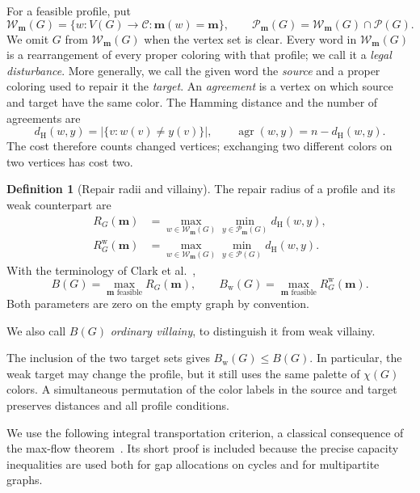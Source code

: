 \documentclass[11pt,reqno]{amsart}
\numberwithin{equation}{section}
\theoremstyle{definition}
\newtheorem{definition}[theorem]{Definition}
\theoremstyle{remark}
\begin{document}
For a feasible profile, put
\[
 \mathcal W_{\mathbf m}(G)=
 \{w:V(G)\to\mathcal C:\mathbf m(w)=\mathbf m\},\qquad
 \mathcal P_{\mathbf m}(G)=\mathcal W_{\mathbf m}(G)\cap\mathcal P(G).
\]
We omit $G$ from $\mathcal W_{\mathbf m}(G)$ when the vertex set is clear.
Every word in $\mathcal W_{\mathbf m}(G)$ is a rearrangement of every
proper coloring with that profile; we call it a \emph{legal disturbance}.
More generally, we call the given word the \emph{source} and a proper
coloring used to repair it the \emph{target}. An \emph{agreement} is a
vertex on which source and target have the same color.
The Hamming distance and the number of agreements are
\[
 d_{\mathrm H}(w,y)=|\{v:w(v)\ne y(v)\}|,
 \qquad \operatorname{agr}(w,y)=n-d_{\mathrm H}(w,y).
\]
The cost therefore counts changed vertices; exchanging two different
colors on two vertices has cost two.

\begin{definition}[Repair radii and villainy]\label{def:repair-radii}
The repair radius of a profile and its weak counterpart are
\begin{align*}
 R_G(\mathbf m)&=
 \max_{w\in\mathcal W_{\mathbf m}(G)}
 \min_{y\in\mathcal P_{\mathbf m}(G)}d_{\mathrm H}(w,y),\\
 R^{\mathrm w}_G(\mathbf m)&=
 \max_{w\in\mathcal W_{\mathbf m}(G)}
 \min_{y\in\mathcal P(G)}d_{\mathrm H}(w,y).
\end{align*}
With the terminology of Clark et al.~\cite{clark2006},
\[
 B(G)=\max_{\mathbf m\text{ feasible}}R_G(\mathbf m),\qquad
 B_{\mathrm w}(G)=\max_{\mathbf m\text{ feasible}}R^{\mathrm w}_G(\mathbf m).
\]
Both parameters are zero on the empty graph by convention.
\end{definition}

We also call $B(G)$ \emph{ordinary villainy}, to distinguish it from
weak villainy.

The inclusion
of the two target sets gives $B_{\mathrm w}(G)\le B(G)$. In particular,
the weak target may change the profile, but it still uses the same palette
of $\chi(G)$ colors. A simultaneous permutation of the color labels in
the source and target preserves distances and all profile conditions.

We use the following integral transportation criterion, a classical
consequence of the max-flow theorem~\cite{fordfulkerson1956}.
Its short proof is included because the precise capacity inequalities
are used both for gap allocations on cycles and for multipartite graphs.
\end{document}
